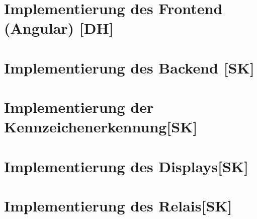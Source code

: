 \section{Implementierung des Frontend (Angular) [DH]}

\section{Implementierung des Backend [SK]}

\section{Implementierung der Kennzeichenerkennung[SK]}

\section{Implementierung des Displays[SK]}

\section{Implementierung des Relais[SK]}
